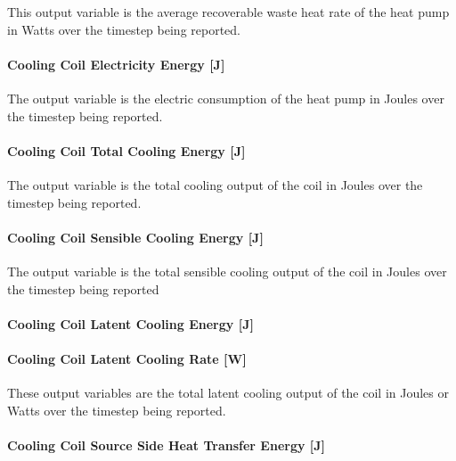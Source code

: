 This output variable is the average recoverable waste heat rate of the heat pump in Watts over the timestep being reported.

\paragraph{Cooling Coil Electricity Energy {[}J{]}}\label{cooling-coil-electric-energy-j-4}

The output variable is the electric consumption of the heat pump in Joules over the timestep being reported.

\paragraph{Cooling Coil Total Cooling Energy {[}J{]}}\label{cooling-coil-total-cooling-energy-j-9}

The output variable is the total cooling output of the coil in Joules over the timestep being reported.

\paragraph{Cooling Coil Sensible Cooling Energy {[}J{]}}\label{cooling-coil-sensible-cooling-energy-j-9}

The output variable is the total sensible cooling output of the coil in Joules over the timestep being reported

\paragraph{Cooling Coil Latent Cooling Energy {[}J{]}}\label{cooling-coil-latent-cooling-energy-j-7}

\paragraph{Cooling Coil Latent Cooling Rate {[}W{]}}\label{cooling-coil-latent-cooling-rate-w-5}

These output variables are the total latent cooling output of the coil in Joules or Watts over the timestep being reported.

\paragraph{Cooling Coil Source Side Heat Transfer Energy {[}J{]}}\label{cooling-coil-source-side-heat-transfer-energy-j-4}

